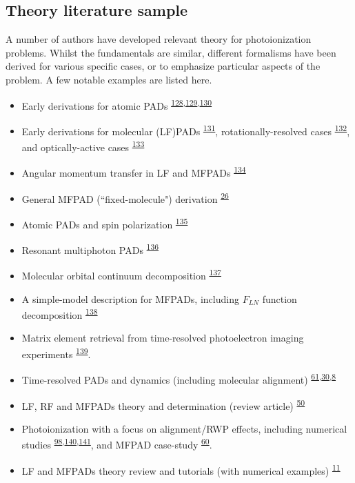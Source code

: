 \documentclass[10pt]{article}
\begin{document}

\subsection{Theory literature sample\label{sec:theory-lit}}

A number of authors have developed relevant theory for photoionization problems. Whilst the fundamentals are similar, different formalisms have been derived for various specific cases, or to emphasize particular aspects of the problem. A few notable examples are listed here.

\begin{itemize}
\item Early derivations for atomic PADs \textsuperscript{\hyperref[csl:128]{128},\hyperref[csl:129]{129},\hyperref[csl:130]{130}}
\item Early derivations for molecular (LF)PADs \textsuperscript{\hyperref[csl:131]{131}}, rotationally-resolved cases \textsuperscript{\hyperref[csl:132]{132}}, and optically-active cases \textsuperscript{\hyperref[csl:133]{133}}
\item Angular momentum transfer in LF and MFPADs \textsuperscript{\hyperref[csl:134]{134}} 
\item General MFPAD (``fixed-molecule") derivation \textsuperscript{\hyperref[csl:26]{26}}
\item Atomic PADs and spin polarization \textsuperscript{\hyperref[csl:135]{135}}
\item Resonant multiphoton PADs \textsuperscript{\hyperref[csl:136]{136}}
\item Molecular orbital continuum decomposition \textsuperscript{\hyperref[csl:137]{137}}
\item A simple-model description for MFPADs, including $F_{LN}$ function decomposition \textsuperscript{\hyperref[csl:138]{138}}
\item Matrix element retrieval from time-resolved photoelectron imaging experiments \textsuperscript{\hyperref[csl:139]{139}}.
\item Time-resolved PADs and dynamics (including molecular alignment) \textsuperscript{\hyperref[csl:61]{61},\hyperref[csl:30]{30},\hyperref[csl:8]{8}}
\item LF, RF and MFPADs theory and determination (review article) \textsuperscript{\hyperref[csl:50]{50}}
\item Photoionization with a focus on alignment/RWP effects, including numerical studies \textsuperscript{\hyperref[csl:98]{98},\hyperref[csl:140]{140},\hyperref[csl:141]{141}}, and MFPAD case-study \textsuperscript{\hyperref[csl:60]{60}}.
\item LF and MFPADs theory review and tutorials (with numerical examples) \textsuperscript{\hyperref[csl:11]{11}}
\end{itemize}
\end{document}
